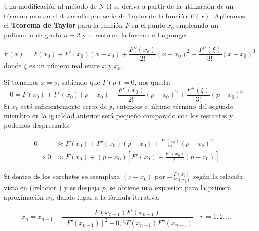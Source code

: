 \documentclass[openany]{book}
\begin{document}
Una modificación al método de N-R se deriva a partir de la utilización de un término más en el desarrollo por serie de Taylor de la función \(F(x)\). Aplicamos el \textbf{Teorema de Taylor} para la función \(F\) en el punto \(x_0\) empleando un polinomio de grado \(n=2\) y el resto en la forma de Lagrange:

\[F(x) = F(x_0) + F'(x_0)(x-x_0) + \frac{F''(x_0)}{2!}(x-x_0)^2 + \frac{F''(\xi)}{3!}(x-x_0)^3\]
donde \(\xi\) es un número real entre \(x\) y \(x_0\).

Si tomamos \(x = p\), sabiendo que \(F(p) = 0\), nos queda:
\[0 = F(x_0) + F'(x_0)(p-x_0) + \frac{F''(x_0)}{2!}(p-x_0)^2 + \frac{F''(\xi)}{3!}(p-x_0)^3\]
Si \(x_0\) está suficientemente cerca de \(p\), entonces el último término del segundo miembro en la igualdad anterior será pequeño comparado con los restantes y podemos despreciarlo:

\begin{equation*} 
\begin{split}
0 & \approx F(x_0) + F'(x_0)(p-x_0) + \frac{F''(x_0)}{2!}(p-x_0)^2 \\
\implies 0 & \approx F(x_0) + (p-x_0) \left[ F'(x_0) + \frac{F''(x_0)}{2!}(p-x_0) \right]
\end{split}
\end{equation*}

Si dentro de los corchetes se reemplaza \((p - x_0)\) por \(- \frac{F(x_0)}{F'(x_0)}\) según la relación vista en (\ref{relacion}) y se despeja \(p\), se obtiene una expresión para la primera aproximación \(x_1\), dando lugar a la fórmula iterativa:

\[
x_n = x_{n-1} - \frac{F(x_{n-1})F'(x_{n-1})}{[F'(x_{n-1})]^2 - 0,5 F(x_{n-1}) F''(x_{n-1})} \quad n = 1, 2, \dots
\]
\end{document}
